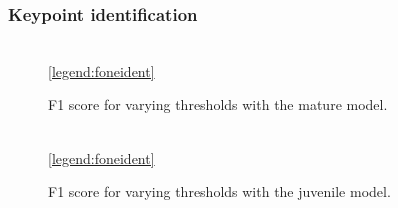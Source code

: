 \subsubsection{Keypoint identification}

\begin{figure}[H]
\centering
{}
\\
\ref{legend:foneident}
\caption{F1 score for varying thresholds with the mature model.}
\label{fig:fonemature}
\end{figure}

\begin{figure}[H]
\centering
{}
\\
\ref{legend:foneident}
\caption{F1 score for varying thresholds with the juvenile model.}
\label{fig:fonejuvenile}
\end{figure}

